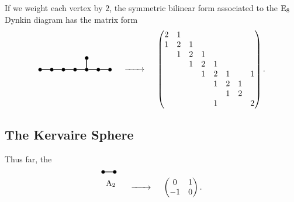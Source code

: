 \begin{example}
	If we weight each vertex by $2$, the symmetric bilinear form associated to the $\mathrm{E}_8$ Dynkin diagram has the matrix form
	\[
		\begin{tikzpicture}
			\tikzset{dynode/.style={circle, draw, fill=black,
						minimum size=4pt, inner sep=0pt}}
			\tikzset{dyline/.style={line width=1pt}}
			\tikzset{dydash/.style={line width=1pt, dashed}}

			\begin{scope}[yshift=-10em, xshift=0]
				\node[dynode] (a1) at (0,0) {};
				\node[dynode] (a2) at (0.5,0) {};
				\node[dynode] (a3) at (1,0) {};
				\node[dynode] (a4) at (1.5,0) {};
				\node[dynode] (a5) at (2,0) {};
				\node[dynode] (a6) at (2.5,0) {};
				\node[dynode] (a7) at (3,0) {};
				\node[dynode] (a8) at (2,0.5) {};

				\draw[dyline] (a1) -- (a2) -- (a3) -- (a4) -- (a5) -- (a6) -- (a7);
				\draw[dyline] (a5) -- (a8);
			\end{scope}
		\end{tikzpicture}
		\quad\lkxto\quad
		\begin{pmatrix}
			2 & 1 &   &   &   &   &   &   \\
			1 & 2 & 1 &   &   &   &   &   \\
			  & 1 & 2 & 1 &   &   &   &   \\
			  &   & 1 & 2 & 1 &   &   &   \\
			  &   &   & 1 & 2 & 1 &  & 1 \\
			  &   &   &   & 1 & 2 & 1 &  \\
			  &   &   &   &  & 1 & 2 &  \\
			  &   &   &   & 1 &  &  & 2 \\
		\end{pmatrix}.
	\]	
\end{example}

\subsection{The Kervaire Sphere}

Thus far, the
	\[
		\begin{tikzpicture}
			\tikzset{dynode/.style={circle, draw, fill=black,
						minimum size=4pt, inner sep=0pt}}
			\tikzset{dyline/.style={line width=1pt}}
			\tikzset{dydash/.style={line width=1pt, dashed}}

				\node[dynode] (a1) at (0,0.5) {};
				\node[dynode] (a2) at (0.5,0.5) {};

				\draw[dyline] (a1) -- (a2);
				\node[] (l) at (0.33,0) {$\mathrm{A}_2$};
		\end{tikzpicture}
		\quad\lkxto\quad
		\begin{pmatrix}
			0 & 1\\
			-1 & 0
		\end{pmatrix}.
	\]	

